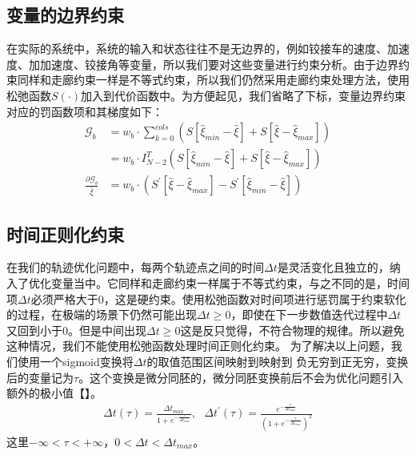\documentclass[master,academic]{ysuthesis} %
\begin{document}
		\subsection{变量的边界约束}
		在实际的系统中，系统的输入和状态往往不是无边界的，例如铰接车的速度、加速度、加加速度、铰接角等变量，所以我们要对这些变量进行约束分析。由于边界约束同样和走廊约束一样是不等式约束，所以我们仍然采用走廊约束处理方法，使用松弛函数$S(\cdot)$加入到代价函数中。为方便起见，我们省略了下标，变量边界约束对应的罚函数项和其梯度如下：
		\begin{equation}
			\begin{aligned}
				\mathcal{G}_b&=w_b\cdot \sum_{k=0}^{cols}{\left( S\left[ \hat{\xi}_{min}-\hat{\xi} \right] +S\left[ \hat{\xi}-\hat{\xi}_{max} \right] \right)}\\
				&=w_b\cdot I_{N-2}^{T}\left( S\left[ \hat{\xi}_{min}-\hat{\xi} \right] +S\left[ \hat{\xi}-\hat{\xi}_{max} \right] \right)\\
				\frac{\partial \mathcal{G}_b}{\hat{\xi}}&=w_b\cdot \left( S^{'}\left[ \hat{\xi}-\hat{\xi}_{max} \right] -S^{'}\left[ \hat{\xi}_{min}-\hat{\xi} \right] \right)
			\end{aligned}
		\end{equation}

		\subsection{时间正则化约束}
		在我们的轨迹优化问题中，每两个轨迹点之间的时间$\Delta t$是灵活变化且独立的，纳入了优化变量当中。它同样和走廊约束一样属于不等式约束，与之不同的是，时间项$\Delta t$必须严格大于0，这是硬约束。使用松弛函数对时间项进行惩罚属于约束软化的过程，在极端的场景下仍然可能出现$\Delta t \ge 0$，即使在下一步数值迭代过程中$\Delta t$又回到小于0。但是中间出现$\Delta t \ge 0$这是反只觉得，不符合物理的规律。所以避免这种情况，我们不能使用松弛函数处理时间正则化约束。
		为了解决以上问题，我们使用一个sigmoid变换将$\Delta t$的取值范围区间映射到映射到 负无穷到正无穷，变换后的变量记为$\tau$。这个变换是微分同胚的，微分同胚变换前后不会为优化问题引入额外的极小值【】。
		\begin{equation}
			\begin{aligned}
				\Delta t\left( \tau \right) =\frac{\Delta t_{max}}{1+e^{-\frac{\tau}{\Delta t_{max}}}},\,\,\,\,\Delta t^{'}\left( \tau \right) =\frac{e^{-\frac{\tau}{\Delta t_{max}}}}{\left( 1+e^{-\frac{\tau}{\Delta t_{max}}} \right) ^2}
			\end{aligned}
		\end{equation}
		这里$-\infty <\tau <+\infty $，$0<\Delta t<\Delta t_{max}$。
		
\end{document}
